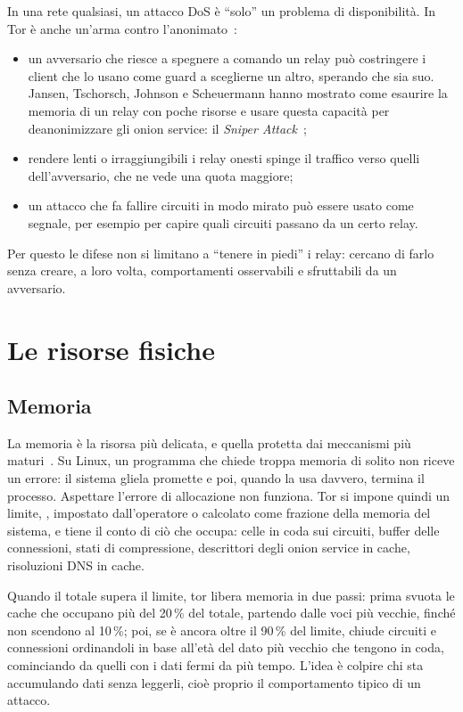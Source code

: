 In una rete qualsiasi, un attacco DoS è \enquote{solo} un problema di disponibilità. In Tor è anche un'arma contro l'anonimato~:
\begin{itemize}
  \item un avversario che riesce a spegnere a comando un relay può costringere i client che lo usano come guard a sceglierne un altro, sperando che sia suo. Jansen, Tschorsch, Johnson e Scheuermann hanno mostrato come esaurire la memoria di un relay con poche risorse e usare questa capacità per deanonimizzare gli onion service: il \emph{Sniper Attack}~\cite{jansen2014sniper};
  \item rendere lenti o irraggiungibili i relay onesti spinge il traffico verso quelli dell'avversario, che ne vede una quota maggiore;
  \item un attacco che fa fallire circuiti in modo mirato può essere usato come segnale, per esempio per capire quali circuiti passano da un certo relay.
\end{itemize}
Per questo le difese non si limitano a \enquote{tenere in piedi} i relay: cercano di farlo senza creare, a loro volta, comportamenti osservabili e sfruttabili da un avversario.

\section{Le risorse fisiche}\label{sec:dos-risorse}

\subsection{Memoria}

La memoria è la risorsa più delicata, e quella protetta dai meccanismi più maturi~. Su Linux, un programma che chiede troppa memoria di solito non riceve un errore: il sistema gliela promette e poi, quando la usa davvero, termina il processo. Aspettare l'errore di allocazione non funziona. Tor si impone quindi un limite, , impostato dall'operatore o calcolato come frazione della memoria del sistema, e tiene il conto di ciò che occupa: celle in coda sui circuiti, buffer delle connessioni, stati di compressione, descrittori degli onion service in cache, risoluzioni DNS in cache.

Quando il totale supera il limite, tor libera memoria in due passi: prima svuota le cache che occupano più del 20\,\% del totale, partendo dalle voci più vecchie, finché non scendono al 10\,\%; poi, se è ancora oltre il 90\,\% del limite, chiude circuiti e connessioni ordinandoli in base all'età del dato più vecchio che tengono in coda, cominciando da quelli con i dati fermi da più tempo. L'idea è colpire chi sta accumulando dati senza leggerli, cioè proprio il comportamento tipico di un attacco.

